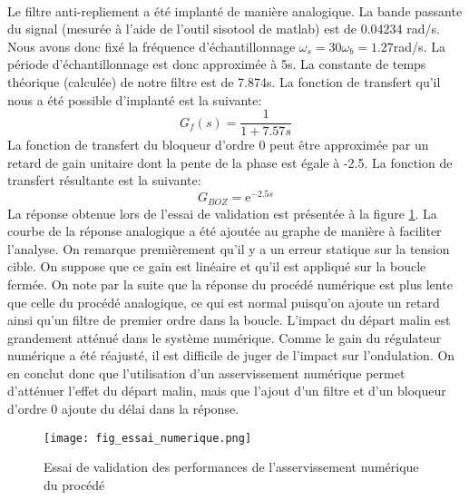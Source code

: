 \paragraph{}Le filtre anti-repliement a été implanté de manière analogique. La bande passante du signal (mesurée à l'aide de l'outil sisotool de matlab) est de 0.04234 rad/s. Nous avons donc fixé la fréquence d'échantillonnage $\omega_s = 30\omega_b = 1.27$rad/s. La période d'échantillonnage est donc approximée à 5s. La constante de temps théorique (calculée) de notre filtre est de 7.874s. La fonction de transfert qu'il nous a été possible d'implanté est la suivante:
\begin{equation}
G_f(s) = \frac{1}{1 + 7.57s}
\end{equation}
La fonction de transfert du bloqueur d'ordre 0 peut être approximée par un retard de gain unitaire dont la pente de la phase est égale à -2.5. La fonction de transfert résultante est la suivante:
\begin{equation}
G_{BOZ} = \mbox{e}^{-2.5s}
\end{equation}
La réponse obtenue lors de l'essai de validation est présentée à la figure \ref{fig6}. La courbe de la réponse analogique a été ajoutée au graphe de manière à faciliter l'analyse. On remarque premièrement qu'il y a un erreur statique sur la tension cible. On suppose que ce gain est linéaire et qu'il est appliqué sur la boucle fermée. On note par la suite que la réponse du procédé numérique est plus lente que celle du procédé analogique, ce qui est normal puisqu'on ajoute un retard ainsi qu'un filtre de premier ordre dans la boucle. L'impact du départ malin est grandement atténué dans le système numérique. Comme le gain du régulateur numérique a été réajusté, il est difficile de juger de l'impact sur l'ondulation. On en conclut donc que l'utilisation d'un asservissement numérique permet d'atténuer l'effet du départ malin, mais que l'ajout d'un filtre et d'un bloqueur d'ordre 0 ajoute du délai dans la réponse.
\begin{figure}[htbp]
\centering
\texttt{[image: fig\_essai\_numerique.png]}
\caption{Essai de validation des performances de l'asservissement numérique du procédé}
\label{fig6}
\end{figure}
